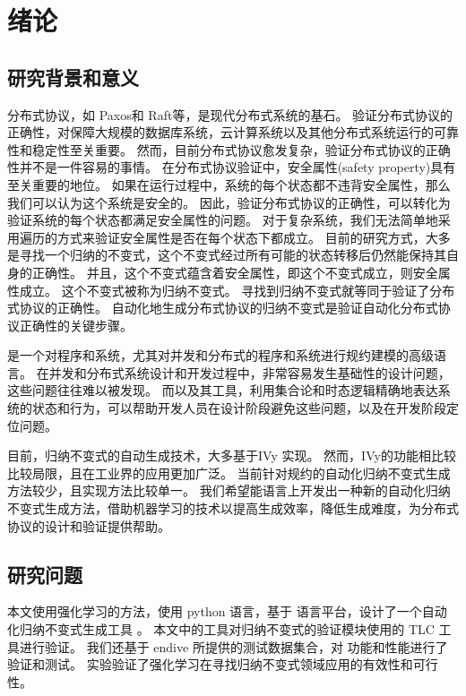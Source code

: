 \chapter{绪论}\label{chap:introduction}

\section{研究背景和意义}
分布式协议，如 Paxos和 Raft等，是现代分布式系统的基石。
验证分布式协议的正确性，对保障大规模的数据库系统，云计算系统以及其他分布式系统运行的可靠性和稳定性至关重要。
然而，目前分布式协议愈发复杂，验证分布式协议的正确性并不是一件容易的事情。
在分布式协议验证中，安全属性(safety property)具有至关重要的地位。
如果在运行过程中，系统的每个状态都不违背安全属性，那么我们可以认为这个系统是安全的。
因此，验证分布式协议的正确性，可以转化为验证系统的每个状态都满足安全属性的问题。
对于复杂系统，我们无法简单地采用遍历的方式来验证安全属性是否在每个状态下都成立。
目前的研究方式，大多是寻找一个归纳的不变式，这个不变式经过所有可能的状态转移后仍然能保持其自身的正确性。
并且，这个不变式蕴含着安全属性，即这个不变式成立，则安全属性成立。
这个不变式被称为归纳不变式\cite{inductive}。
寻找到归纳不变式就等同于验证了分布式协议的正确性。\cite{towards}
自动化地生成分布式协议的归纳不变式是验证自动化分布式协议正确性的关键步骤。

\TLA \cite{TLA+}是一个对程序和系统，尤其对并发和分布式的程序和系统进行规约建模的高级语言。
在并发和分布式系统设计和开发过程中，非常容易发生基础性的设计问题，这些问题往往难以被发现。
而\TLA 以及其工具，利用集合论和时态逻辑精确地表达系统的状态和行为，可以帮助开发人员在设计阶段避免这些问题，以及在开发阶段定位问题。

目前，归纳不变式的自动生成技术，大多基于IVy \cite{Ivy} 实现。
然而，IVy的功能相比较\TLA 比较局限，且\TLA 在工业界的应用更加广泛。
当前针对\TLA 规约的自动化归纳不变式生成方法较少，且实现方法比较单一。
我们希望能\TLA 语言上开发出一种新的自动化归纳不变式生成方法，借助机器学习的技术以提高生成效率，降低生成难度，为分布式协议的设计和验证提供帮助。

\section{研究问题}
本文使用强化学习的方法，使用 python 语言，基于 \TLA 语言平台，设计了一个自动化归纳不变式生成工具 \rltla。
本文中的工具对归纳不变式的验证模块使用的 TLC 工具进行验证。
我们还基于 endive 所提供的测试数据集合，对 \rltla 功能和性能进行了验证和测试。
实验验证了强化学习在寻找归纳不变式领域应用的有效性和可行性。

